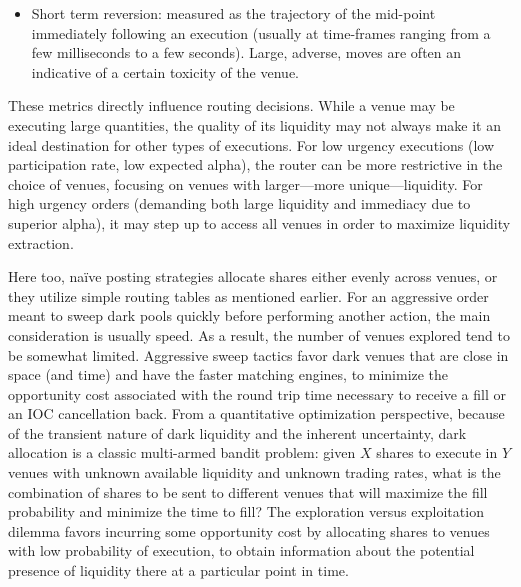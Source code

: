 \begin{itemize}
\begin{itemize}
\item Short term reversion: measured as the trajectory of the mid-point immediately following an execution (usually at time-frames ranging from a few milliseconds to a few seconds). Large, adverse, moves are often an indicative of a certain toxicity of the venue. 
\end{itemize}


These metrics directly influence routing decisions. While a venue may be executing large quantities, the quality of its liquidity may not always make it an ideal destination for other types of executions. For low urgency executions (low participation rate, low expected alpha), the router can be more restrictive in the choice of venues, focusing on venues with larger---more unique---liquidity. For high urgency orders (demanding both large liquidity and immediacy due to superior alpha), it may step up to access all venues in order to maximize liquidity extraction.


Here too, na\"ive posting strategies allocate shares either evenly across venues, or they utilize simple routing tables as mentioned earlier. For an aggressive order meant to sweep dark pools quickly before performing another action, the main consideration is usually speed. As a result, the number of venues explored tend to be somewhat limited. Aggressive sweep tactics favor dark venues that are close in space (and time) and have the faster matching engines, to minimize the opportunity cost associated with the round trip time necessary to receive a fill or an IOC cancellation back. From a quantitative optimization perspective, because of the transient nature of dark liquidity and the inherent uncertainty, dark allocation is a classic multi-armed bandit problem: given $X$ shares to execute in $Y$ venues with unknown available liquidity and unknown trading rates, what is the combination of shares to be sent to different venues that will maximize the fill probability and minimize the time to fill? The exploration versus exploitation dilemma favors incurring some opportunity cost by allocating shares to venues with low probability of execution, to obtain information about the potential presence of liquidity there at a particular point in time.



\end{itemize}
